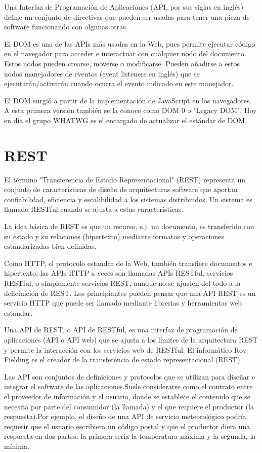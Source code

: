 \begin{remark}
Una Interfaz de Programación de Aplicaciones (API, por sus siglas en inglés) define un conjunto de directivas que pueden ser usadas para tener una pieza de software funcionando con algunas otras.
\end{remark}

El DOM es una de las APIs más usadas en la Web, pues permite ejecutar código en el navegador para acceder e interactuar con cualquier nodo del documento. Estos nodos pueden crearse, moverse o modificarse. Pueden añadirse a estos nodos manejadores de eventos (event listeners en inglés) que se ejecutarán/activarán cuando ocurra el evento indicado en este manejador.

El DOM surgió a partir de la implementación de JavaScript en los navegadores. A esta primera versión también se la conoce como DOM 0 o "Legacy DOM". Hoy en día el grupo WHATWG es el encargado de actualizar el estándar de DOM.


\section{REST}

El término "Transferencia de Estado Representacional" (REST) representa un conjunto de características de diseño de arquitecturas software que aportan confiabilidad, eficiencia y escalibilidad a los sistemas distribuidos. Un sistema es llamado RESTful cuando se ajusta a estas características.

La idea básica de REST es que un recurso, e.j. un documento, es transferido con su estado y su relaciones (hipertexto) mediante formatos y operaciones estandarizadas bien definidas.

Como HTTP, el protocolo estandar de la Web, también transfiere documentos e hipertexto, las APIs HTTP a veces son llamadas APIs RESTful, servicios RESTful, o simplemente servicios REST, aunque no se ajusten del todo a la deficinición de REST. Los principiantes pueden pensar que una API REST es un servicio HTTP que puede ser llamado mediante librerias y herramientas web estandar.

Una API de REST, o API de RESTful, es una interfaz de programación de aplicaciones (API o API web) que se ajusta a los límites de la arquitectura REST y permite la interacción con los servicios web de RESTful. El informático Roy Fielding es el creador de la transferencia de estado representacional (REST).

Las API son conjuntos de definiciones y protocolos que se utilizan para diseñar e integrar el software de las aplicaciones.Suele considerarse como el contrato entre el proveedor de información y el usuario, donde se establece el contenido que se necesita por parte del consumidor (la llamada) y el que requiere el productor (la respuesta).Por ejemplo, el diseño de una API de servicio meteorológico podría requerir que el usuario escribiera un código postal y que el productor diera una respuesta en dos partes: la primera sería la temperatura máxima y la segunda, la mínima.

